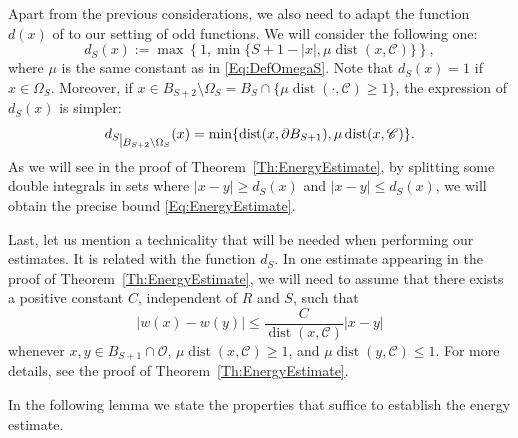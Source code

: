 \documentclass[12pt,reqno]{amsart}
\theoremstyle{definition}
\theoremstyle{remark}
\newcommand{\ccal}{\mathscr{C}}
\newcommand{\ocal}{\mathcal{O}}
\newcommand{\restr}[2]{{#1}_{\mkern 1mu \vrule height 2ex\mkern2mu #2}}
\DeclareMathOperator{\dist}{dist}
\numberwithin{equation}{section}
\begin{document}
Apart from the previous considerations, we also need to adapt the function $d(x)$ of \cite{SavinValdinoci-EnergyEstimate} to our setting of odd functions. We will consider the following one: 
$$ 
d_S(x) := \max\left\{1,\min\{S+1-|x|,\mu \dist(x,\ccal)\} \right\},  
$$
where $\mu$ is the same constant as in \eqref{Eq:DefOmegaS}. Note that $d_S(x) = 1$ if $x\in \Omega_S$. Moreover, if $x\in B_{S+2}\setminus \Omega_S = B_S \cap \{\mu\dist(\cdot,\ccal) \geq 1\}$,  the expression of $d_S(x)$ is simpler:
\begin{align*}
\restr{d_S}{B_{S+2}\setminus \Omega_S} (x) 
= \min \{\dist(x, \partial B_{S+1}),\mu \dist(x,\ccal)\} .
\end{align*}
As we will see in the proof of Theorem~\ref{Th:EnergyEstimate}, by splitting some double integrals in sets where $|x-y|\geq d_S(x)$ and $|x-y|\leq d_S(x)$, we will obtain the precise bound \eqref{Eq:EnergyEstimate}. 

Last, let us mention a technicality that will be needed when performing our estimates. It is related with the function $d_S$. In one estimate appearing in the proof of Theorem~\ref{Th:EnergyEstimate}, we will need to assume that there exists a positive constant $C$, independent of $R$ and $S$, such that
$$ 
|w(x)-w(y)| \leq \frac{C}{\dist(x,\ccal)}|x-y| 
$$
whenever $x,y \in B_{S+1}\cap \ocal$, $\mu \dist(x,\ccal)\geq 1$, and $\mu \dist(y,\ccal)\leq 1$. For more details, see the proof of Theorem~\ref{Th:EnergyEstimate}.

In the following lemma we state the properties that suffice to establish the energy estimate.
\end{document}
